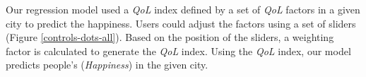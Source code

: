 \documentclass[final,5p,times,twocolumn,authoryear]{elsarticle}
\begin{document}
Our regression model used a \emph{QoL} index defined by a set of \emph{QoL} factors in a given city to predict the happiness.
Users could adjust the factors using a set of sliders (Figure \ref{controls-dots-all}). Based on the position of the sliders, a weighting factor is calculated to generate the \emph{QoL} index.
Using the \emph{QoL} index, our model predicts people's (\emph{Happiness}) in the given city.


\end{document}

